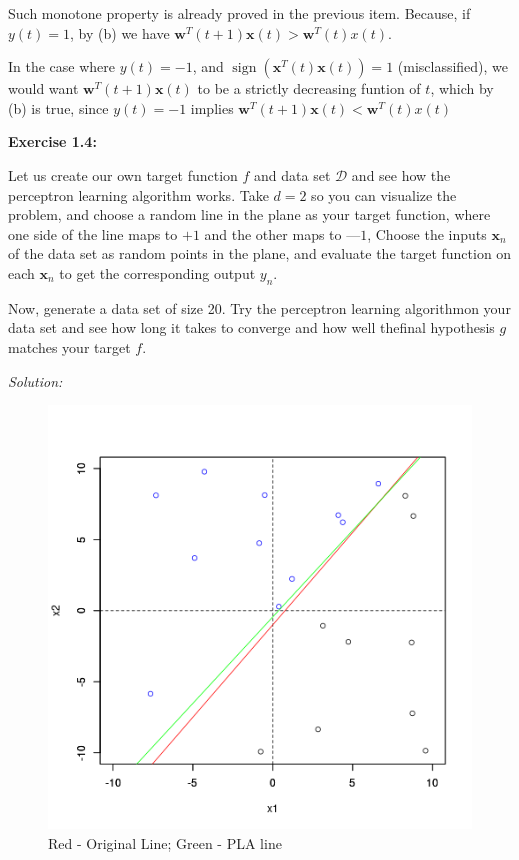 \documentclass[12pt,letterpaper]{article}
\newcommand{\bx}{\boldsymbol{x}}
\newcommand{\bw}{\boldsymbol{w}}
\newcommand{\sign}{\operatorname{sign}}
\begin{document}
\begin{enumerate}[(a)]
		Such monotone property is already proved in the previous item. Because, if $y(t)=1$, by (b) we have $\bw^{T}(t+1)\bx(t)>\bw^{T}(t)x(t)$.
		
		In the case where $y(t)=-1$, and $\sign(\bx^{T}(t)\bx(t))=1$ (misclassified), we would want $\bw^{T}(t+1)\bx(t)$ to be a strictly decreasing funtion of $t$, which by (b) is true, since $y(t)=-1$ implies $\bw^{T}(t+1)\bx(t)<\bw^{T}(t)x(t)$
		
		\textbf{Exercise 1.4:}
		
		Let  us  create  our  own  target  function  $f$   and  data  set $\mathcal{D}$  and  see  how  the perceptron  learning  algorithm  works.  Take $d = 2$ so  you  can  visualize  the problem,  and  choose  a  random  line  in  the  plane  as  your  target  function, where one side of the  line  maps to $+1$  and  the other  maps to $—1$,  Choose the  inputs $\bx_n$  of the data  set  as  random  points  in  the  plane,  and  evaluate the target  function  on  each $\bx_n$ to get the corresponding output $y_n$.
		
		 Now, generate a  data  set of size 20.  Try the perceptron  learning algorithmon  your  data  set  and  see  how  long  it  takes  to  converge  and  how  well  thefinal  hypothesis $g$  matches your target  $f$.  
		 
		 \subitem \textit{Solution:} 
		 \begin{figure}[!htb]
		 	\centering
		 	\label{pla}
		 	\includegraphics[scale=0.75]{figs/ex1.4_PLA.png}
		 	\caption{Red - Original Line; Green - PLA line}
		 \end{figure} 
	 

\end{enumerate}
\end{document}
